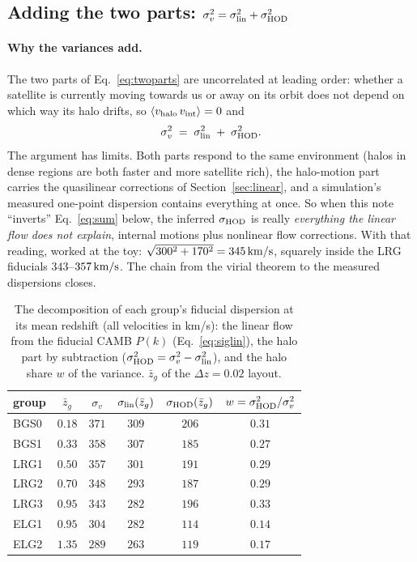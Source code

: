 \documentclass[11pt]{article}
\newcommand{\sv}{\sigma_v}
\newcommand{\slin}{\sigma_{\rm lin}}
\newcommand{\shod}{\sigma_{\rm HOD}}
\newcommand{\kms}{\,{\rm km/s}}
\begin{document}
\subsection{Adding the two parts: $\sv^2 = \slin^2 + \shod^2$}
\label{sec:sum}

\paragraph{Why the variances add.}
The two parts of Eq.~\eqref{eq:twoparts} are uncorrelated at leading
order: whether a satellite is currently moving towards us or away on
its orbit does not depend on which way its halo drifts, so
$\langle v_{\rm halo}\, v_{\rm int}\rangle = 0$ and
\begin{equation}
  \sv^2 \;=\; \slin^2 \;+\; \shod^2 .
  \label{eq:sum}
\end{equation}
The argument has limits.  Both parts respond to the same environment
(halos in dense regions are both faster and more satellite rich), the
halo-motion part carries the quasilinear corrections of
Section~\ref{sec:linear}, and a simulation's measured one-point
dispersion contains everything at once.  So when this note
``inverts'' Eq.~\eqref{eq:sum} below, the inferred $\shod$ is really
\emph{everything the linear flow does not explain}, internal motions
plus nonlinear flow corrections.  With that reading, worked at the
toy: $\sqrt{300^2 + 170^2} = 345\kms$, squarely inside the LRG
fiducials $343$--$357\kms$.  The chain from the virial theorem to the
measured dispersions closes.

\begin{table}[tbp]
  \centering
  \begin{tabular}{lccccc}
    \hline
    group & $\bar{z}_g$ & $\sv$ & $\slin(\bar{z}_g)$
    & $\shod(\bar{z}_g)$ & $w = \shod^2/\sv^2$ \\
    \hline
    BGS0 & $0.18$ & $371$ & $309$ & $206$ & $0.31$ \\
    BGS1 & $0.33$ & $358$ & $307$ & $185$ & $0.27$ \\
    LRG1 & $0.50$ & $357$ & $301$ & $191$ & $0.29$ \\
    LRG2 & $0.70$ & $348$ & $293$ & $187$ & $0.29$ \\
    LRG3 & $0.95$ & $343$ & $282$ & $196$ & $0.33$ \\
    ELG1 & $0.95$ & $304$ & $282$ & $114$ & $0.14$ \\
    ELG2 & $1.35$ & $289$ & $263$ & $119$ & $0.17$ \\
    \hline
  \end{tabular}
  \caption{The decomposition of each group's fiducial dispersion at
    its mean redshift (all velocities in km/s): the linear flow from
    the fiducial CAMB $P(k)$ (Eq.~\eqref{eq:siglin}), the halo part by
    subtraction ($\shod^2 = \sv^2 - \slin^2$), and the halo share $w$
    of the variance.  $\bar{z}_g$ of the $\Delta z = 0.02$ layout.}
  \label{tab:decomposition}
\end{table}
\end{document}
